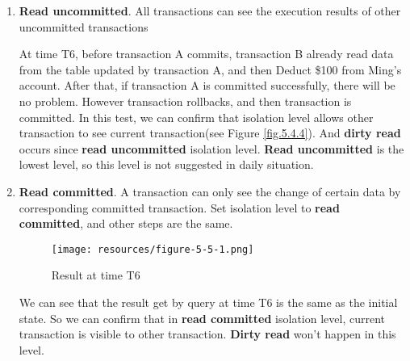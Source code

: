 \documentclass[onecolumn, oneside, ctexart, UTF8, b4paper]{SUSTechHomework}
\newcommand{\upcite}[1]{\textsuperscript{\textsuperscript{\cite{#1}}}}
\begin{document}
\begin{enumerate}
    \item
    \textbf{Read uncommitted}. All transactions can see the execution results of other uncommitted transactions\upcite{ref4}
    \begin{figure}[H]
    \centering
    \end{figure}
    At time T6, before transaction A commits, transaction B already read data from the table updated by transaction A, and then Deduct \$100 from Ming's account. After that, if transaction A is committed successfully, there will be no problem. However transaction rollbacks, and then transaction is committed. In this test, we can confirm that isolation level allows other transaction to see current transaction(see Figure \ref{fig.5.4.4}). And \textbf{dirty read} occurs since \textbf{read uncommitted} isolation level. \textbf{Read uncommitted} is the lowest level, so this level is not suggested in daily situation.

    \item
    \textbf{Read committed}. A transaction can only see the change of certain data by corresponding committed transaction. Set isolation level to \textbf{read committed}, and other steps are the same.
    \begin{figure}[H]
        \centering
        \texttt{[image: resources/figure-5-5-1.png]}
        \caption{Result at time T6}
        \label{fig:my_label}
    \end{figure}
    We can see that the result get by query at time T6 is the same as the initial state. So we can confirm that in \textbf{read committed} isolation level, current transaction is visible to other transaction. \textbf{Dirty read} won't happen in this level.


\end{enumerate}
\end{document}
